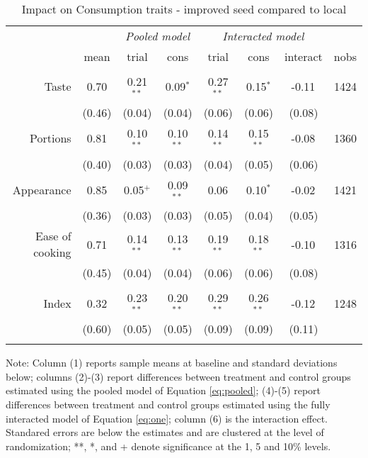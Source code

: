 \documentclass[english]{article}\usepackage[]{graphicx}\usepackage[]{xcolor}
\begin{document}
\begin{sidewaystable}
\caption{Impact on Consumption traits - improved seed compared to local\label{cons_traits_compare}}

\footnotesize
\begin{center}
\begin{tabular}{rccccccc}
\hline\hline
& & \multicolumn{2}{c}{\textit{Pooled model}} & \multicolumn{3}{c}{\textit{Interacted model}} \\
& mean & trial & cons & trial & cons & interact & nobs \\
\hline
\\
Taste
& 0.70
& 0.21$^{**}$
& 0.09$^{*}$ 
& 0.27$^{**}$ 
& 0.15$^{*}$
& -0.11$^{}$ & 1424 \\

& (0.46) & (0.04)  & (0.04) & (0.06)  & (0.06)  & (0.08)
 \\

Portions
& 0.81
& 0.10$^{**}$
& 0.10$^{**}$ 
& 0.14$^{**}$ 
& 0.15$^{**}$
& -0.08$^{}$ & 1360 \\

& (0.40) & (0.03)  & (0.03) & (0.04)  & (0.05)  & (0.06)
 \\

Appearance
& 0.85
& 0.05$^{+}$
& 0.09$^{**}$ 
& 0.06$^{}$ 
& 0.10$^{*}$
& -0.02$^{}$ & 1421 \\

& (0.36) & (0.03)  & (0.03) & (0.05)  & (0.04)  & (0.05)
 \\

Ease of cooking
& 0.71
& 0.14$^{**}$
& 0.13$^{**}$ 
& 0.19$^{**}$ 
& 0.18$^{**}$
& -0.10$^{}$ & 1316 \\

& (0.45) & (0.04)  & (0.04) & (0.06)  & (0.06)  & (0.08)
 \\
\\
Index
& 0.32
& 0.23$^{**}$
& 0.20$^{**}$ 
& 0.29$^{**}$ 
& 0.26$^{**}$
& -0.12$^{}$ & 1248 \\

& (0.60) & (0.05)  & (0.05) & (0.09)  & (0.09)  & (0.11)
 \\
\\

\hline\hline
\end{tabular}
\end{center}
\scriptsize
Note: Column (1) reports sample means at baseline and standard deviations below;  columns (2)-(3) report differences between treatment and control groups estimated using the pooled model of Equation  \ref{eq:pooled}; (4)-(5) report differences between treatment and control groups estimated using the fully interacted model of Equation \ref{eq:one}; column (6) is the interaction effect. Standared errors are below the estimates and are clustered at the level of randomization; **, *, and + denote significance at the 1, 5 and 10\% levels.
\end{sidewaystable}
\end{document}
